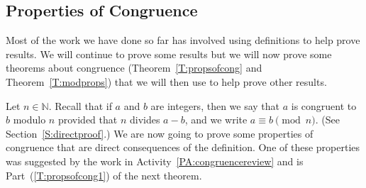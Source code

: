 \subsection*{Properties of Congruence}
%
Most of the work we have done so far has involved using definitions to help prove results.  We will continue to prove some results but we will now prove some theorems about congruence (Theorem~\ref{T:propsofcong} and Theorem~\ref{T:modprops}) that we will then use to help prove other results.  

Let  $n \in \mathbb{N}$.  Recall that if  $a$  and  $b$  are integers, then we say that  $a$  is congruent to  $b$  modulo  $n$  provided that  $n$  divides  $a - b$, and we write  
$a \equiv b \pmod n$.  (See Section~\ref{S:directproof}.)  
%
%
%
We are now going to prove some properties of congruence that are direct consequences of the definition.  One of these properties was suggested by the work in \typeu  Activity~\ref*{PA:congruencereview} and is 
Part~(\ref{T:propsofcong1}) of the next theorem.

